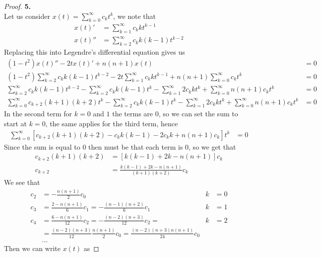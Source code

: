 \documentclass[11pt]{article}
\theoremstyle{definition}
\begin{document}
\cleardoublepage
\begin{proof}{\textbf{5.}}\\
Let us consider $x(t) = \sum_{k=0}^\infty c_k t^k$, we note that
\begin{align*}
    x(t)' &= \sum_{k=1}^\infty c_k kt^{k-1} \\
    x(t)'' &= \sum_{k=2}^\infty c_k k(k-1)t^{k-2}
\end{align*}
Replacing this into Legendre's differential equation gives us
\begin{align*}
    (1 - t^2)x(t)'' - 2tx(t)' + n(n+1)x(t) &= 0\\
    (1 - t^2)\sum_{k=2}^\infty c_k k(k-1) t^{k-2}
    - 2t\sum_{k=1}^\infty c_k kt^{k-1}
    + n(n+1)\sum_{k=0}^\infty c_k t^{k} &= 0\\
    \sum_{k=2}^\infty c_k k(k-1) t^{k-2}
    - \sum_{k=2}^\infty c_k k(k-1) t^{k}
    - \sum_{k=1}^\infty 2c_kk t^{k}
    + \sum_{k=0}^\infty n(n+1)c_k t^{k} &= 0\\
    \sum_{k=0}^\infty c_{k + 2} (k + 1)(k + 2) t^{k}
    - \sum_{k=2}^\infty c_k k(k-1) t^{k}
    - \sum_{k=1}^\infty 2c_kk t^{k}
    + \sum_{k=0}^\infty n(n+1)c_k t^{k} &= 0
\end{align*}
In the second term for $k = 0$ and $1$ the terms are 0, so we can set the sum to
start at $k = 0$, the same applies for the third term, hence
\begin{align*}
    \sum_{k=0}^\infty [c_{k + 2} (k + 1)(k + 2) - c_k k(k-1) 
    - 2c_kk + n(n+1)c_k]t^{k} &= 0
\end{align*}
Since the sum is equal to 0 then must be that each term is 0, so we get that
\begin{align*}
    c_{k + 2} (k + 1)(k + 2) &= [k(k-1) 
    + 2k - n(n+1)]c_k\\
    c_{k + 2} &= \frac{k(k-1) 
    + 2k - n(n+1)}{(k + 1)(k + 2)}c_k
\end{align*}
We see that
\begin{align*}
    c_2 &= -\frac{n(n+1)}{2}c_0 & k &= 0\\
    c_3 &= \frac{2 - n(n + 1)}{6}c_1 = -\frac{(n-1)(n+2)}{6}c_1 & k &= 1\\
    c_4 &= \frac{6 -n(n+1)}{12}c_2 = -\frac{(n -2)(n + 3)}{12}c_2 = & k &= 2\\
        &= \frac{(n -2)(n + 3)}{12}\frac{n(n+1)}{2}c_0 = 
        \frac{(n -2)(n + 3)n(n+1)}{24}c_0 &   &  \\
    &... 
\end{align*}
Then we can write $x(t)$ as

\end{proof}
\end{document}
